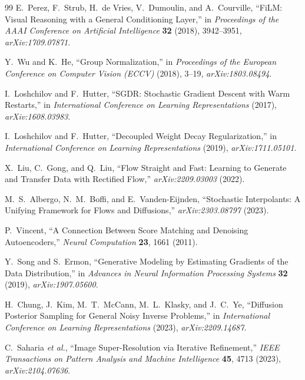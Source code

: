 \documentclass[11pt]{article}
\theoremstyle{definition}
\begin{document}
\begin{thebibliography}{99}
E.~Perez, F.~Strub, H.~de Vries, V.~Dumoulin, and A.~Courville,
``FiLM: Visual Reasoning with a General Conditioning Layer,''
in \emph{Proceedings of the AAAI Conference on Artificial Intelligence} \textbf{32} (2018), 3942--3951,
\emph{arXiv:1709.07871}.

Y.~Wu and K.~He,
``Group Normalization,''
in \emph{Proceedings of the European Conference on Computer Vision (ECCV)} (2018), 3--19,
\emph{arXiv:1803.08494}.

I.~Loshchilov and F.~Hutter,
``SGDR: Stochastic Gradient Descent with Warm Restarts,''
in \emph{International Conference on Learning Representations} (2017),
\emph{arXiv:1608.03983}.

I.~Loshchilov and F.~Hutter,
``Decoupled Weight Decay Regularization,''
in \emph{International Conference on Learning Representations} (2019),
\emph{arXiv:1711.05101}.

X.~Liu, C.~Gong, and Q.~Liu,
``Flow Straight and Fast: Learning to Generate and Transfer Data with Rectified Flow,''
\emph{arXiv:2209.03003} (2022).

M.~S.~Albergo, N.~M.~Boffi, and E.~Vanden-Eijnden,
``Stochastic Interpolants: A Unifying Framework for Flows and Diffusions,''
\emph{arXiv:2303.08797} (2023).

P.~Vincent,
``A Connection Between Score Matching and Denoising Autoencoders,''
\emph{Neural Computation} \textbf{23}, 1661 (2011).

Y.~Song and S.~Ermon,
``Generative Modeling by Estimating Gradients of the Data Distribution,''
in \emph{Advances in Neural Information Processing Systems} \textbf{32} (2019),
\emph{arXiv:1907.05600}.

H.~Chung, J.~Kim, M.~T.~McCann, M.~L.~Klasky, and J.~C.~Ye,
``Diffusion Posterior Sampling for General Noisy Inverse Problems,''
in \emph{International Conference on Learning Representations} (2023),
\emph{arXiv:2209.14687}.

C.~Saharia \emph{et al.},
``Image Super-Resolution via Iterative Refinement,''
\emph{IEEE Transactions on Pattern Analysis and Machine Intelligence} \textbf{45}, 4713 (2023),
\emph{arXiv:2104.07636}.

\end{thebibliography}
\end{document}
